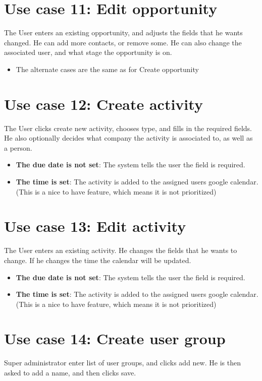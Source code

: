\section{Use case 11: Edit opportunity }
\label{app:usecase:editopportunity}
The User enters an existing opportunity, and adjusts the fields that he wants
changed. He can add more contacts, or remove some. He can also change the
associated user, and what stage the opportunity is on. 

\begin{itemize}
  \item The alternate cases are the same as for Create opportunity 
\end{itemize}

\section{Use case 12: Create activity }
The User clicks create new activity, chooses type, and fills in the required
fields. He also optionally decides what company the activity is associated to,
as well as a person. 

\begin{itemize}
  \item \textbf{The due date is not set}: The system tells the user the field is
    required. 
  \item \textbf{The time is set}: The activity is added to the assigned users
    google calendar. (This is a nice to have feature, which means it is not
    prioritized) 
\end{itemize}

\section{Use case 13: Edit activity }
\label{app:usecase:editactivity}
The User enters an existing activity. He changes the fields that he wants to
change. If he changes the time the calendar will be updated. 

\begin{itemize}
  \item \textbf{The due date is not set}: The system tells the user the field is
    required. 
  \item \textbf{The time is set}: The activity is added to the assigned users
    google calendar. (This is a nice to have feature, which means it is not
    prioritized) 
\end{itemize}

\section{Use case 14: Create user group }
Super administrator enter list of user groups, and clicks add new. He is then
asked to add a name, and then clicks save. 

